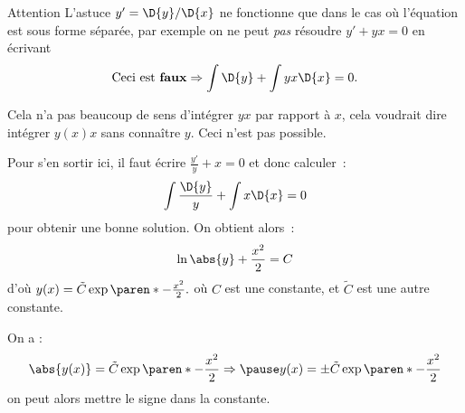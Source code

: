 \begin{frame}
  \begin{alertblock}{Attention}\pause{}
    L'astuce \(y' = \D{y}/\D{x}\) ne fonctionne que dans le cas où l'équation est sous forme séparée,\pause{} par exemple on ne peut \emph{pas} résoudre \(y' + y x = 0\) en écrivant\pause{}
    \begin{equation*}
      \text{Ceci est \textbf{faux}} \Rightarrow    \int\D{y} + \int y x \D{x} = 0.
    \end{equation*}\pause{}

    Cela n'a pas beaucoup de sens d'intégrer \(yx\) par rapport à \(x\),\pause{} cela voudrait dire intégrer \(y(x) x\) sans connaître \(y\).\pause{} Ceci n'est pas possible.
  \end{alertblock}
\end{frame}
\begin{frame}
  \begin{example}
    Pour s'en sortir ici,\pause{} il faut écrire \(\frac{y'}{y} + x = 0\)\pause{} et donc calculer~:\pause{}
    \begin{equation*}
      \int \frac{\D{y}}{y} + \int x \D{x} = 0
    \end{equation*}
    pour obtenir une bonne solution.\pause{} On obtient alors~:
    \begin{equation*}
      \ln\abs{y} + \frac{x^{2}}{2} = C
    \end{equation*}\pause{}
    d'où
    \begin{math}
      y(x) = \tilde{C} \exp{\paren*{{-\frac{x^{2}}{2}}}}.
    \end{math}\pause{}
    où \(C\) est une constante, et \(\tilde{C}\) est une autre constante.
  \end{example}
  \begin{remark*}\pause{}
    \pause{}On a :
    \begin{equation*}
      \abs{y(x)} = \tilde{C} \exp{\paren*{{-\frac{x^{2}}{2}}}}
\Rightarrow\pause
      y(x) = \pm \tilde{C} \exp{\paren*{{-\frac{x^{2}}{2}}}}
    \end{equation*}\pause{}
    on peut alors \og mettre le signe dans la constante\fg{}.
  \end{remark*}
\end{frame}
